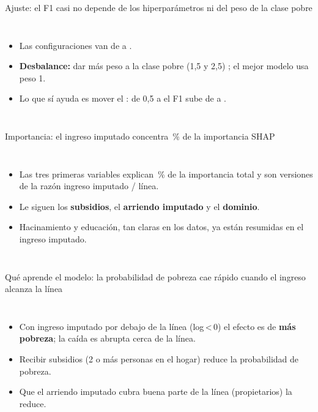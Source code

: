 \begin{frame}{Ajuste: el F1 casi no depende de los hiperparámetros ni del peso de la clase pobre}
  \begin{columns}[T]
    \small
    \begin{itemize}\setlength{\itemsep}{3pt}
      \item Las \nNConfigs{} configuraciones van de \nFoneSearchMin{} a \nFoneSearchMax{}.
      \item \textbf{Desbalance:} dar más peso a la clase pobre (1,5 y 2,5) ; el mejor modelo usa peso 1.
      \item Lo que sí ayuda es mover el : de 0,5 a \nThrLGBM{} el F1 sube de \nFoneLGBMAtHalf{} a \nFoneLGBM{}.
    \end{itemize}
  \end{columns}
\end{frame}

\begin{frame}{Importancia: el ingreso imputado concentra \nShareSHAPD{}\,\% de la importancia SHAP}
  \begin{columns}[T]
    \small
    \begin{itemize}\setlength{\itemsep}{3pt}
      \item Las tres primeras variables explican \nShareSHAPTopThree{}\,\% de la importancia total y son versiones de la razón ingreso imputado / línea.
      \item Le siguen los \textbf{subsidios}, el \textbf{arriendo imputado} y el \textbf{dominio}.
      \item Hacinamiento y educación, tan claras en los datos, ya están resumidas en el ingreso imputado.
    \end{itemize}
  \end{columns}
\end{frame}

\begin{frame}{Qué aprende el modelo: la probabilidad de pobreza cae rápido cuando el ingreso alcanza la línea}
  \begin{columns}[T]
    \small
    \begin{itemize}\setlength{\itemsep}{3pt}
      \item Con ingreso imputado por debajo de la línea (log\,<\,0) el efecto es de \textbf{más pobreza}; la caída es abrupta cerca de la línea.
      \item Recibir subsidios (2 o más personas en el hogar) reduce la probabilidad de pobreza.
      \item Que el arriendo imputado cubra buena parte de la línea (propietarios) la reduce.
    \end{itemize}
  \end{columns}
\end{frame}

